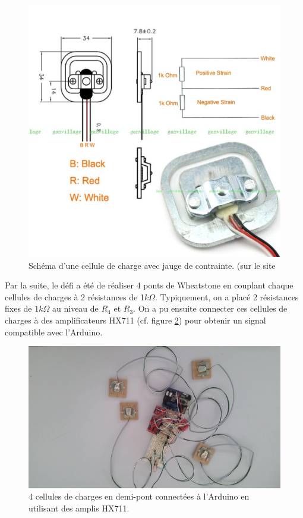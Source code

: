 \documentclass{polytech/polytech}
\begin{document}
\begin{figure}
\begin{center}
\includegraphics[width=12cm]{image/load_sensor.jpg}
\end{center}
\caption{Schéma d'une cellule de charge avec jauge de contrainte. (sur le site \cite{load_cell}}
\label{fig:load_sensor}
\end{figure}

Par la suite, le défi a été de réaliser 4 ponts de Wheatstone en couplant chaque cellules de charges à 2 résistances de 1$k\Omega$. Typiquement, on a placé 2 résistances fixes de $1k\Omega$ au niveau de $R_4$ et $R_3$.  On a pu ensuite connecter ces cellules de charges à des amplificateurs HX711 (cf. figure \ref{fig:load_sensor_connected}) pour obtenir un signal compatible avec l'Arduino.

\begin{figure}
\begin{center}
\includegraphics[width=12cm]{image/load_sensor_connected.jpg}
\end{center}
\caption{4 cellules de charges en demi-pont connectées à l'Arduino en utilisant des amplis HX711.}
\label{fig:load_sensor_connected}
\end{figure}
\end{document}
